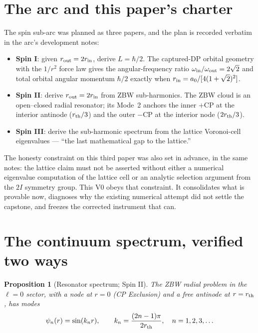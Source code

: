 \documentclass[12pt]{article}
\newcommand{\rth}{r_{\rm th}}
\newcommand{\rin}{r_{\rm in}}
\newcommand{\rout}{r_{\rm out}}
\newcommand{\aBohr}{a_0}
\newtheorem{proposition}{Proposition}
\begin{document}
\tableofcontents

\section{The arc and this paper's charter}
\label{sec:arc}

The spin sub-arc was planned as three papers, and the plan is recorded
verbatim in the arc's development notes:
\begin{itemize}[leftmargin=2em]
\item \textbf{Spin I}: given $\rout = 2\rin$, derive $L = \hbar/2$.
The captured-DP orbital geometry with the $1/r^2$ force law gives the
angular-frequency ratio $\omega_{\rm in}/\omega_{\rm out} = 2\sqrt{2}$
and total orbital angular momentum $\hbar/2$ exactly when
$\rin = \aBohr/[4(1+\sqrt{2})^2]$.
\item \textbf{Spin II}: derive $\rout = 2\rin$ from ZBW sub-harmonics.
The ZBW cloud is an open--closed radial resonator; its Mode~2 anchors
the inner $+$CP at the interior antinode ($\rth/3$) and the outer $-$CP
at the interior node ($2\rth/3$).
\item \textbf{Spin III}: derive the sub-harmonic spectrum from the
lattice Voronoi-cell eigenvalues --- ``the last mathematical gap to the
lattice.''
\end{itemize}
The honesty constraint on this third paper was also set in advance, in
the same notes: the lattice claim must not be asserted without either a
numerical eigenvalue computation of the lattice cell or an analytic
selection argument from the $2I$ symmetry group.  This V0 obeys that
constraint.  It consolidates what is provable now, diagnoses why the
existing numerical attempt did not settle the capstone, and freezes the
corrected instrument that can.

\section{The continuum spectrum, verified two ways}
\label{sec:spectrum}

\begin{proposition}[Resonator spectrum; Spin II]
The ZBW radial problem in the $\ell = 0$ sector, with a node at $r = 0$
(CP Exclusion) and a free antinode at $r = \rth$, has modes
\begin{equation}
\psi_n(r) = \sin(k_n r), \qquad
k_n = \frac{(2n-1)\pi}{2\rth}, \quad n = 1, 2, 3, \ldots
\label{eq:spectrum}
\end{equation}
\end{proposition}
\end{document}
